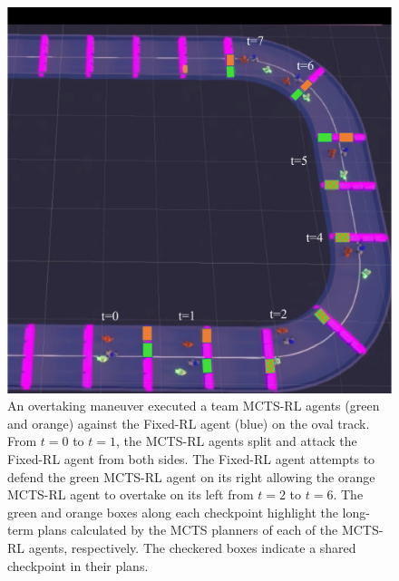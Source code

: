  \begin{figure}
  \centering
  \includegraphics[height=0.7\textheight]{Figures/MCTSRLTeamOvertake.pdf}
  \caption [Overtaking maneuver by team of MCTS-RL agents.] {An overtaking maneuver executed a team MCTS-RL agents (green and orange) against the Fixed-RL agent (blue) on the oval track. From $t=0$ to $t=1$, the MCTS-RL agents split and attack the Fixed-RL agent from both sides. The Fixed-RL agent attempts to defend the green MCTS-RL agent on its right allowing the orange MCTS-RL agent to overtake on its left from $t=2$ to $t=6$. The green and orange boxes along each checkpoint highlight the long-term plans calculated by the MCTS planners of each of the MCTS-RL agents, respectively. The checkered boxes indicate a shared checkpoint in their plans.}
  \label{fig:team_mctsrl:overtake}
\end{figure}

